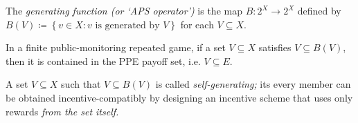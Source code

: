 \begin{definition}
	\label{definition:gen_B}
	The \emph{generating function (or `APS operator')} is the map $B : 2^X \to 2^X$ defined by $B(V) \coloneqq \left\{ v \in X : \text{$v$ is generated by $V$} \right\}$ for each $V \subseteq X$.
\end{definition}

\begin{proposition}
	\label{proposition:self-gen}
	In a finite public-monitoring repeated game, if a set $V \subseteq X$ satisfies $V \subseteq B(V)$, then it is contained in the PPE payoff set, i.e. $V \subseteq E$.
\end{proposition}

A set $V \subseteq X$ such that $V \subseteq B(V)$ is called \emph{self-generating;} its every member can be obtained incentive-compatibly by designing an incentive scheme that uses only rewards \emph{from the set itself.}

